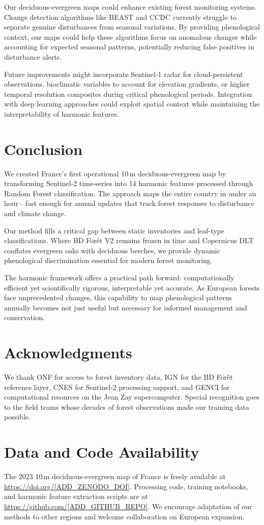 \documentclass[utf8]{FrontiersinHarvard}
\begin{document}
Our deciduous-evergreen maps could enhance existing forest monitoring systems. Change detection algorithms like BEAST \citep{Zhao2019} and CCDC \citep{Zhu2014} currently struggle to separate genuine disturbances from seasonal variations. By providing phenological context, our maps could help these algorithms focus on anomalous changes while accounting for expected seasonal patterns, potentially reducing false positives in disturbance alerts.

Future improvements might incorporate Sentinel-1 radar for cloud-persistent observations, bioclimatic variables to account for elevation gradients, or higher temporal resolution composites during critical phenological periods. Integration with deep learning approaches could exploit spatial context while maintaining the interpretability of harmonic features.


\section{Conclusion}

We created France's first operational 10\,m deciduous-evergreen map by transforming Sentinel-2 time-series into 14 harmonic features processed through Random Forest classification. The approach maps the entire country in under an hour—fast enough for annual updates that track forest responses to disturbance and climate change.

Our method fills a critical gap between static inventories and leaf-type classifications. Where BD Forêt V2 remains frozen in time and Copernicus DLT conflates evergreen oaks with deciduous beeches, we provide dynamic phenological discrimination essential for modern forest monitoring.

The harmonic framework offers a practical path forward: computationally efficient yet scientifically rigorous, interpretable yet accurate. As European forests face unprecedented changes, this capability to map phenological patterns annually becomes not just useful but necessary for informed management and conservation.

\section*{Acknowledgments}
We thank ONF for access to forest inventory data, IGN for the BD Forêt reference layer, CNES for Sentinel-2 processing support, and GENCI for computational resources on the Jean Zay supercomputer. Special recognition goes to the field teams whose decades of forest observations made our training data possible.

\section*{Data and Code Availability}
The 2023 10\,m deciduous-evergreen map of France is freely available at \url{https://doi.org/[ADD_ZENODO_DOI]}. 
Processing code, training notebooks, and harmonic feature extraction scripts are at \url{https://github.com/[ADD_GITHUB_REPO]}.
We encourage adaptation of our methods to other regions and welcome collaboration on European expansion.



\end{document}
